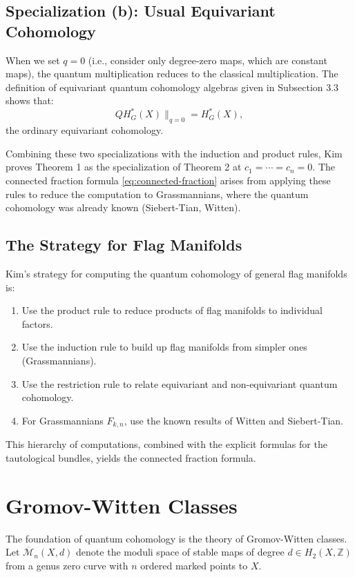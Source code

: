 \subsection{Specialization (b): Usual Equivariant Cohomology}
When we set $q = 0$ (i.e., consider only degree-zero maps, which are constant maps), the quantum multiplication reduces to the classical multiplication. The definition of equivariant quantum cohomology algebras given in Subsection 3.3 shows that:
\[
QH_G^*(X) \|_{q=0} = H_G^*(X),
\]
the ordinary equivariant cohomology.

Combining these two specializations with the induction and product rules, Kim proves Theorem 1 as the specialization of Theorem 2 at $c_1 = \cdots = c_n = 0$. The connected fraction formula \cref{eq:connected-fraction} arises from applying these rules to reduce the computation to Grassmannians, where the quantum cohomology was already known (Siebert-Tian, Witten).

\subsection{The Strategy for Flag Manifolds}
Kim's strategy for computing the quantum cohomology of general flag manifolds is:
\begin{enumerate}
\item Use the product rule to reduce products of flag manifolds to individual factors.
\item Use the induction rule to build up flag manifolds from simpler ones (Grassmannians).
\item Use the restriction rule to relate equivariant and non-equivariant quantum cohomology.
\item For Grassmannians $F_{k,n}$, use the known results of Witten and Siebert-Tian.
\end{enumerate}
This hierarchy of computations, combined with the explicit formulas for the tautological bundles, yields the connected fraction formula.

\section{Gromov-Witten Classes}

The foundation of quantum cohomology is the theory of Gromov-Witten classes. Let $\overline{\mathcal{M}}_n(X, d)$ denote the moduli space of stable maps of degree $d \in H_2(X, \mathbb{Z})$ from a genus zero curve with $n$ ordered marked points to $X$.

